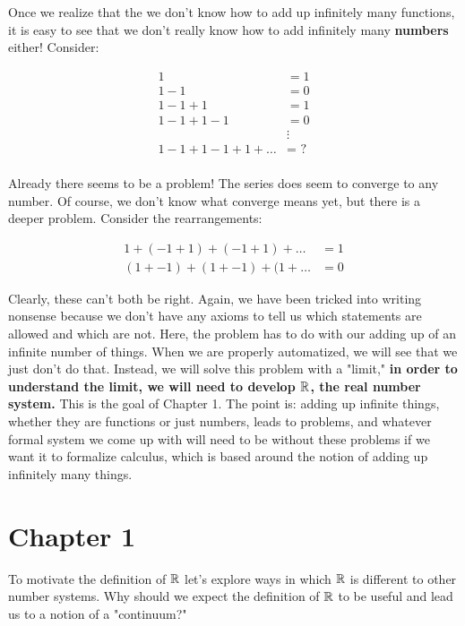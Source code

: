 

Once we realize that the we don't know how to add up infinitely many functions, it is easy to see that we don't really know how to add infinitely many \textbf{numbers} either! Consider:

\begin{align*}
	1 &= 1 \\ 
	1 - 1 &= 0\\
	1 - 1 + 1 &= 1 \\
	1 - 1 + 1 - 1 &= 0 \\
		      &\vdots \\
	1 - 1 + 1 - 1 + 1 + \ldots &= \text{ ?} \\
\end{align*}

Already there seems to be a problem! The series does seem to converge to any number. Of course, we don't know what converge means yet, but there is a deeper problem. Consider the rearrangements:

\begin{align*}
	1 + (- 1 + 1) + (- 1 + 1) + \ldots &= 1 \\  
	(1 + - 1) + (1 + - 1) + (1 + \dots &= 0 	
\end{align*}

Clearly, these can't both be right. Again, we have been tricked into writing nonsense because we don't have any axioms to tell us which statements are allowed and which are not. Here, the problem has to do with our adding up of an infinite number of things. When we are properly automatized, we will see that we just don't do that. Instead, we will solve this problem with a "limit," \textbf{in order to understand the limit, we will need to develop $\mathbb{R}$, the real number system.} This is the goal of Chapter 1. The point is: adding up infinite things, whether they are functions or just numbers, leads to problems, and whatever formal system we come up with will need to be without these problems if we want it to formalize calculus, which is based around the notion of adding up infinitely many things.


\section*{Chapter 1}
To motivate the definition of $\mathbb{R}$ let's explore ways in which $\mathbb{R}$ is different to other number systems. Why should we expect the definition of $\mathbb{R}$ to be useful and lead us to a notion of a "continuum?"

